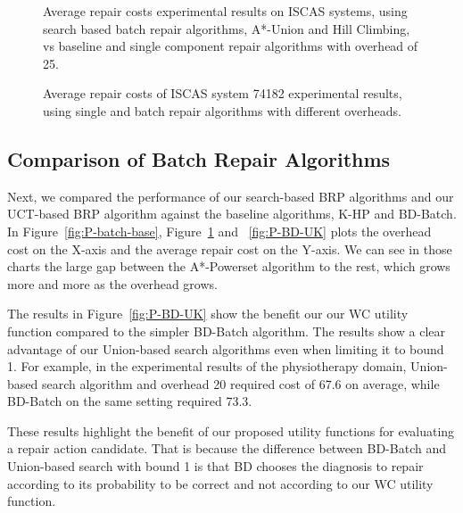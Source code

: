 \documentclass[a4paper,11pt]{report}
\newcommand\hilla[1]{\textcolor{blue}{hilla: #1}}
\newcommand\roni[1]{\textcolor{green}{roni: #1}}
\begin{document}
\begin{figure}{}
  \caption{Average repair costs experimental results on ISCAS systems,
  using search based batch repair algorithms, A*-Union and Hill Climbing, vs baseline and single component repair algorithms with overhead of 25.}
  \label{fig:I-batch-base-single}
\end{figure}

\begin{figure}{}
  \caption{Average repair costs of ISCAS system 74182 experimental results, using single and batch repair algorithms with different overheads.}
  \label{fig:I-bvs-74182}
\end{figure}

\subsection{Comparison of Batch Repair Algorithms}
Next, we compared the performance of our search-based BRP algorithms and our UCT-based BRP algorithm
against the baseline algorithms, K-HP and BD-Batch.
In Figure~\ref{fig:P-batch-base}, Figure~\ref{fig:I-batch-base-single} and ~\ref{fig:P-BD-UK} plots the overhead cost on the X-axis and the average repair cost on the Y-axis. We can see in those charts the large gap between the A*-Powerset algorithm to the rest, which grows more and more as the overhead grows. 


The results in Figure~\ref{fig:P-BD-UK} show the benefit our our WC utility function compared to the simpler BD-Batch algorithm. The results show a clear advantage of our Union-based search algorithms even when limiting it to bound 1. 
For example, in the experimental results of the physiotherapy domain, Union-based search algorithm and overhead 20 required cost of 67.6 on average, while BD-Batch on the same setting required 73.3.

These results highlight the benefit of our proposed utility functions for evaluating a repair action candidate. That is because the difference between BD-Batch and Union-based search with bound 1 is that BD chooses the diagnosis to repair according to its probability to be correct and not according to our WC utility function. 
\end{document}

